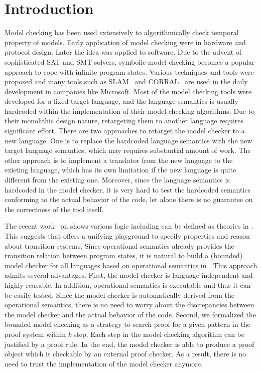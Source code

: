 \documentclass{almostllncs}
\begin{document}
\section{Introduction}
Model checking has been used extensively to algorithmically check temporal property of models.
Early application of model checking were in hardware and protocol design.
Later the idea was applied to software.
Due to the advent of sophisticated SAT and SMT solvers, symbolic model checking becomes a popular approach to cope with infinite program states.
Various techniques and tools were proposed and many tools such as SLAM~\cite{SLAM} and CORRAL~\cite{corral-a-solver-for-reachability-modulo-theories-2} are used in the daily development in companies like Microsoft.
Most of the model checking tools were developed for a fixed target language, and the language semantics is usually hardcoded within the implementation of their model checking algorithms.
Due to their monolithic design nature, retargeting them to another language requires significant effort.
There are two approaches to retarget the model checker to a new language.
One is to replace the hardcoded language semantics with the new target language semantics, which may requires substantial amount of work.
The other approach is to implement a translator from the new language to the existing language, which has its own limitation if the new language is quite different from the existing one.
Moreover, since the language semantics is hardcoded in the model checker, it is very hard to test the hardcoded semantics conforming to the actual behavior of the code, let alone there is no guarantee on the correctness of the tool itself.

The recent work~\cite{chen-rosu-2019-lics} on \mmul shows various logic including \modmul can be defined as theories in \mmul.
This suggests that \mmul offers a unifying playground to specify properties and reason about transition systems.
Since operational semantics already provides the transition relation between program states, it is natural to build a (bounded) model checker for all languages based on operational semantics in \mmul.
This approach admits several advantages.
First, the model checker is language-independent and highly reusable.
In addition, operational semantics is executable and thus it can be easily tested.
Since the model checker is automatically derived from the operational semantics, there is no need to worry about the discrepancies between the model checker and the actual behavior of the code.
Second, we formalized the bounded model checking as a strategy to search proof for a given pattern in the \mmul proof system within \emph{k} step.
Each step in the model checking algorithm can be justified by a \mmul proof rule.
In the end, the model checker is able to produce a proof object which is checkable by an external proof checker.
As a result, there is no need to trust the implementation of the model checker anymore.
\end{document}
